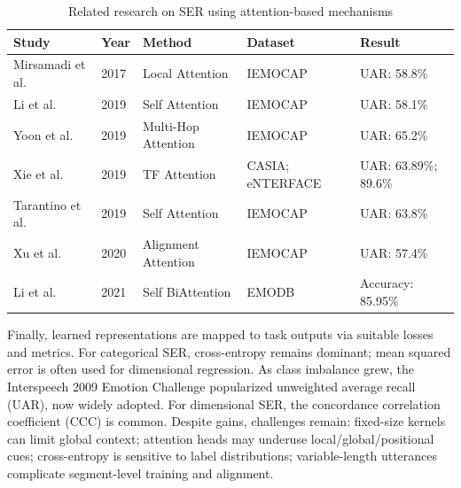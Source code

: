 \begin{table}[h!tbp]
    \centering
    \small
    \caption{Related research on SER using attention-based mechanisms}
    \label{tab:ser_attention_related_work}
    \setlength{\tabcolsep}{5pt}
    \renewcommand{\arraystretch}{1.1}
    \begin{tabularx}{\textwidth}{lll>{\raggedright\arraybackslash}X>{\raggedright\arraybackslash}X}
    \hline
    Study & Year & Method & Dataset & Result \\
    \hline
    Mirsamadi et al. \cite{mirsamadi2017automatic} & 2017 & Local Attention & IEMOCAP & UAR: 58.8\% \\
    Li et al. \cite{li2019improved} & 2019 & Self Attention & IEMOCAP & UAR: 58.1\% \\
    Yoon et al. \cite{yoon2019speech} & 2019 & Multi-Hop Attention & IEMOCAP & UAR: 65.2\% \\
    Xie et al. \cite{xie2019speech} & 2019 & TF Attention & CASIA; eNTERFACE & UAR: 63.89\%; 89.6\% \\
    Tarantino et al. \cite{tarantino2019self} & 2019 & Self Attention & IEMOCAP & UAR: 63.8\% \\
    Xu et al. \cite{xu2019learning} & 2020 & Alignment Attention & IEMOCAP & UAR: 57.4\% \\
    Li et al. \cite{li2021speech} & 2021 & Self BiAttention & EMODB & Accuracy: 85.95\% \\
    \hline
    \end{tabularx}
\end{table}




Finally, learned representations are mapped to task outputs via suitable losses and metrics. For categorical SER, cross-entropy remains dominant; mean squared error is often used for dimensional regression. As class imbalance grew, the Interspeech 2009 Emotion Challenge popularized unweighted average recall (UAR), now widely adopted. For dimensional SER, the concordance correlation coefficient (CCC) is common. Despite gains, challenges remain: fixed-size kernels can limit global context; attention heads may underuse local/global/positional cues; cross-entropy is sensitive to label distributions; variable-length utterances complicate segment-level training and alignment.
